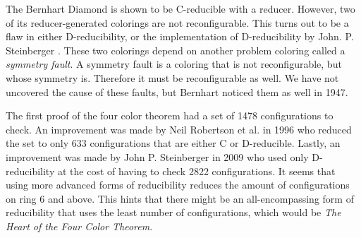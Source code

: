 The Bernhart Diamond is shown to be C-reducible with a reducer. However, two of its reducer-generated colorings are not reconfigurable. This turns out to be a flaw in either D-reducibility, or the implementation of D-reducibility by John. P. Steinberger \cite{johnp}. These two colorings depend on another problem coloring called a \textit{symmetry fault}. A symmetry fault is a coloring that is not reconfigurable, but whose symmetry is. Therefore it must be reconfigurable as well. We have not uncovered the cause of these faults, but Bernhart \cite{bernhart} noticed them as well in 1947.

The first proof of the four color theorem had a set of 1478 configurations to check. An improvement was made by Neil Robertson et al. \cite{thomas} in 1996 who reduced the set to only 633 configurations that are either C or D-reducible. Lastly, an improvement was made by John P. Steinberger in 2009 who used only D-reducibility at the cost of having to check 2822 configurations. It seems that using more advanced forms of reducibility reduces the amount of configurations on ring 6 and above. This hints that there might be an all-encompassing form of reducibility that uses the least number of configurations, which would be \textit{The Heart of the Four Color Theorem}.